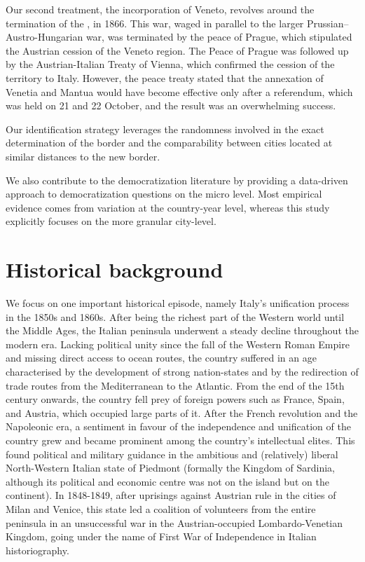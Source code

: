 Our second treatment, the incorporation of Veneto, revolves around the termination of the , in 1866. This war, waged in parallel to the larger Prussian--Austro-Hungarian war, was terminated by the peace of Prague, which stipulated the Austrian cession of the Veneto region. The Peace of Prague was followed up by the Austrian-Italian Treaty of Vienna, which confirmed the cession of the territory to Italy. However, the peace treaty stated that the annexation of Venetia and Mantua would have become effective only after a referendum, which was held on 21 and 22 October, and the result was an overwhelming success. 


Our identification strategy leverages the randomness involved in the exact determination of the border and the comparability between cities located at similar distances to the new border. 

We also contribute to the democratization literature by providing a data-driven approach to democratization questions on the micro level. Most empirical evidence comes from variation at the country-year level, whereas this study explicitly focuses on the more granular city-level. 

\section{Historical background}
We focus on one important historical episode, namely Italy’s unification process in the 1850s and 1860s. After being the richest part of the Western world until the Middle Ages, the Italian peninsula underwent a steady decline throughout the modern era. Lacking political unity since the fall of the Western Roman Empire and missing direct access to ocean routes, the country suffered in an age characterised by the development of strong nation-states and by the redirection of trade routes from the Mediterranean to the Atlantic. From the end of the 15th century onwards, the country fell prey of foreign powers such as France, Spain, and Austria, which occupied large parts of it. After the French revolution and the Napoleonic era, a sentiment in favour of the independence and unification of the country grew and became prominent among the country's intellectual elites. This found political and military guidance in the ambitious and (relatively) liberal North-Western Italian state of Piedmont (formally the Kingdom of Sardinia, although its political and economic centre was not on the island but on the continent). In 1848-1849, after uprisings against Austrian rule in the cities of Milan and Venice, this state led a coalition of volunteers from the entire peninsula in an unsuccessful war in the Austrian-occupied Lombardo-Venetian Kingdom, going under the name of First War of Independence in Italian historiography. 

